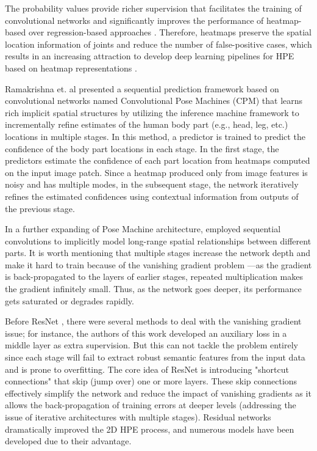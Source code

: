The probability values provide richer supervision that facilitates the training of convolutional networks and significantly improves the performance of heatmap-based over regression-based approaches \cite{artacho_unipose_2020, bulat_human_2016,gkioxari_chained_2016, lifshitz_human_2016,newell_stacked_2016,tompson_efficient_2015}. Therefore, heatmaps preserve the spatial location information of joints and reduce the number of false-positive cases, which results in an increasing attraction to develop deep learning pipelines for HPE based on heatmap representations \cite{carreira_human_2016,luo_lstm_2018,toshev_deeppose_2014,wei_convolutional_2016}.

Ramakrishna et. al \cite{ramakrishna_pose_2014} presented a sequential prediction framework based on convolutional networks named Convolutional Pose Machines (CPM) that learns rich implicit spatial structures by utilizing the inference machine framework to incrementally refine estimates of the human body part (e.g., head, leg, etc.) locations in multiple stages. In this method, a predictor is trained to predict the confidence of the body part locations in each stage. In the first stage, the predictors estimate the confidence of each part location from heatmaps computed on the input image patch. Since a heatmap produced only from image features is noisy and has multiple modes, in the subsequent stage, the network iteratively refines the estimated confidences using contextual information from outputs of the previous stage. 

In a further expanding of Pose Machine architecture, \cite{wei_convolutional_2016} employed sequential convolutions to implicitly model long-range spatial relationships between different parts. It is worth mentioning that multiple stages increase the network depth and make it hard to train because of the vanishing gradient problem ---as the gradient is back-propagated to the layers of earlier stages, repeated multiplication makes the gradient infinitely small. Thus, as the network goes deeper, its performance gets saturated or degrades rapidly. 

Before ResNet \cite{he_deep_2016}, there were several methods to deal with the vanishing gradient issue; for instance, the authors of this work \cite{wei_convolutional_2016} developed an auxiliary loss in a middle layer as extra supervision. But this can not tackle the problem entirely since each stage will fail to extract robust semantic features from the input data and is prone to overfitting. The core idea of ResNet is introducing "shortcut connections" that skip (jump over) one or more layers. These skip connections effectively simplify the network and reduce the impact of vanishing gradients as it allows the back-propagation of training errors at deeper levels (addressing the issue of iterative architectures with multiple stages). Residual networks dramatically improved the 2D HPE process, and numerous models \cite{cai_learning_2020, chen_cascaded_2018, chu_multi-context_2017, ke_multi-scale_2018, liu_cascaded_2018, newell_stacked_2016, su_multi-person_2019, sun_deep_2019, xiao_simple_2018-1, yang_learning_2017} have been developed due to their advantage. 

